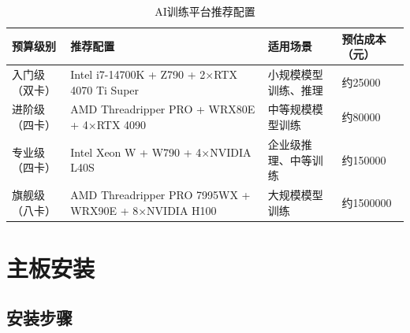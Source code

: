 \documentclass[12pt,UTF8]{ctexbook}
\begin{document}
\begin{table}[H]
    \centering
    \begin{tabular}{|p{3cm}|p{4cm}|p{4cm}|p{4cm}|}
        \hline
        \textbf{预算级别} & \textbf{推荐配置} & \textbf{适用场景} & \textbf{预估成本（元）} \\
        \hline
        入门级（双卡） & Intel i7-14700K + Z790 + 2×RTX 4070 Ti Super & 小规模模型训练、推理 & 约25000 \\
        \hline
        进阶级（四卡） & AMD Threadripper PRO + WRX80E + 4×RTX 4090 & 中等规模模型训练 & 约80000 \\
        \hline
        专业级（四卡） & Intel Xeon W + W790 + 4×NVIDIA L40S & 企业级推理、中等训练 & 约150000 \\
        \hline
        旗舰级（八卡） & AMD Threadripper PRO 7995WX + WRX90E + 8×NVIDIA H100 & 大规模模型训练 & 约1500000 \\
        \hline
    \end{tabular}
    \caption{AI训练平台推荐配置}
    \label{tab:ai_training_configs}
\end{table}

\chapter{主板安装}

\section{安装步骤}
\end{document}
